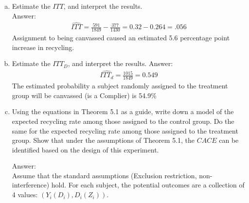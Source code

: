 \documentclass[11pt,notitlepage]{article}\usepackage[]{graphicx}\usepackage[]{color}
\begin{document}
\begin{enumerate}[a)]
\item Estimate the $ITT$, and interpret the results.\\
Answer:\\
\begin{align*}
\widehat{ITT} = \frac{591}{1849} - \frac{377}{1430} = 0.32 - 0.264 = .056 
\end{align*}
Assignment to being canvassed caused an estimated 5.6 percentage point increase in recycling.
\item Estimate the $ITT_D$, and interpret the results.
Answer:\\
\begin{align*}
\widehat{ITT_d} = \frac{1015}{1849} = 0.549
\end{align*}
The estimated probability a subject randomly assigned to the treatment group will be canvassed (is a Complier) is 54.9\% 
\item Using the equations in Theorem 5.1 as a guide, write down a model of the expected recycling rate among those assigned to the control group. Do the same for the expected recycling rate among those assigned to the treatment group. Show that under the assumptions of Theorem 5.1, the $CACE$ can be identified based on the design of this experiment.

Answer:\\

Assume that the standard assumptions (Exclusion restriction, non-interference) hold. For each subject, the potential outcomes are a collection of 4 values: $(Y_i(D_i), D_i(Z_i))$. \\


\end{enumerate}
\end{document}
